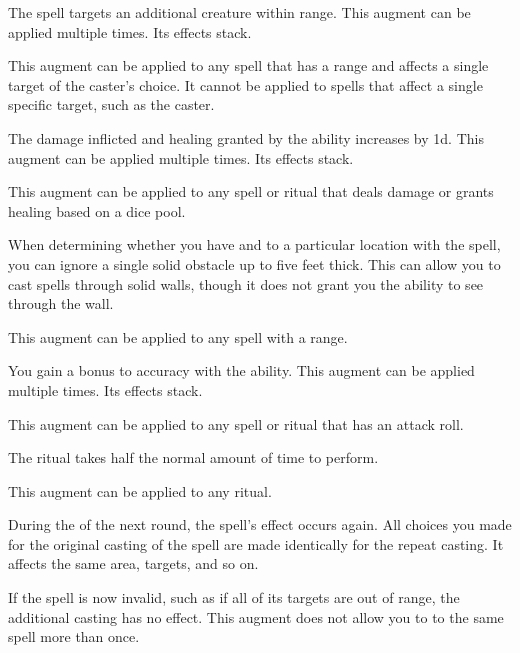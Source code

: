              The spell targets an additional creature within range.
            This augment can be applied multiple times.
            Its effects stack.
            \par This augment can be applied to any spell that has a range and affects a single target of the caster's choice.
            It cannot be applied to spells that affect a single specific target, such as the caster.

             The damage inflicted and healing granted by the ability increases by \plus1d.
            This augment can be applied multiple times.
            Its effects stack.
            \par This augment can be applied to any spell or ritual that deals damage or grants healing based on a dice pool.

             When determining whether you have  and  to a particular location with the spell, you can ignore a single solid obstacle up to five feet thick.
            This can allow you to cast spells through solid walls, though it does not grant you the ability to see through the wall.
            \par This augment can be applied to any spell with a range.

             You gain a  bonus to accuracy with the ability.
            This augment can be applied multiple times.
            Its effects stack.
            \par This augment can be applied to any spell or ritual that has an attack roll.

             The ritual takes half the normal amount of time to perform.
            \par This augment can be applied to any ritual.

             During the  of the next round, the spell's effect occurs again.
            All choices you made for the original casting of the spell are made identically for the repeat casting.
            It affects the same area, targets, and so on.

            If the spell is now invalid, such as if all of its targets are out of range, the additional casting has no effect.
            This augment does not allow you to  to the same spell more than once.

